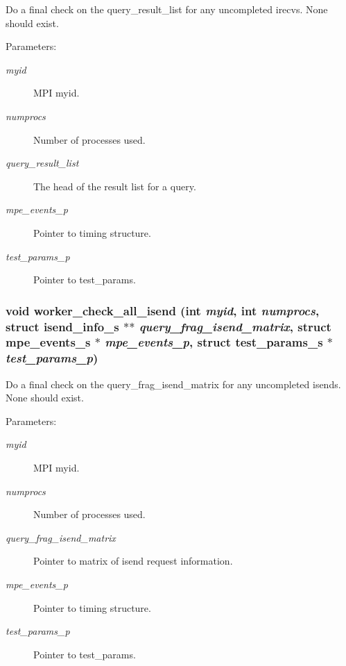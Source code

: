 Do a final check on the query\_\-result\_\-list for any uncompleted irecvs. None should exist.

\begin{Desc}
\item[Parameters:]
\begin{description}
\item[{\em myid}]MPI myid. \item[{\em numprocs}]Number of processes used. \item[{\em query\_\-result\_\-list}]The head of the result list for a query. \item[{\em mpe\_\-events\_\-p}]Pointer to timing structure. \item[{\em test\_\-params\_\-p}]Pointer to test\_\-params. \end{description}
\end{Desc}
\subsubsection{\setlength{\rightskip}{0pt plus 5cm}void worker\_\-check\_\-all\_\-isend (int {\em myid}, int {\em numprocs}, struct \bf{isend\_\-info\_\-s} $\ast$$\ast$ {\em query\_\-frag\_\-isend\_\-matrix}, struct \bf{mpe\_\-events\_\-s} $\ast$ {\em mpe\_\-events\_\-p}, struct \bf{test\_\-params\_\-s} $\ast$ {\em test\_\-params\_\-p})}\label{worker__help_8h_8d5c9557c44361908b0d95a7ea13c120}


Do a final check on the query\_\-frag\_\-isend\_\-matrix for any uncompleted isends. None should exist.

\begin{Desc}
\item[Parameters:]
\begin{description}
\item[{\em myid}]MPI myid. \item[{\em numprocs}]Number of processes used. \item[{\em query\_\-frag\_\-isend\_\-matrix}]Pointer to matrix of isend request information. \item[{\em mpe\_\-events\_\-p}]Pointer to timing structure. \item[{\em test\_\-params\_\-p}]Pointer to test\_\-params. \end{description}
\end{Desc}
